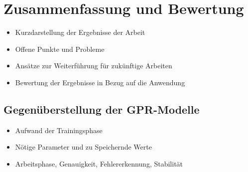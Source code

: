 %

\chapter{Zusammenfassung und Bewertung}\label{ch:zusammenfassung}
\begin{itemize}
	\item Kurzdarstellung der Ergebnisse der Arbeit
	\item Offene Punkte und Probleme
	\item Ansätze zur Weiterführung für zukünftige Arbeiten
	\item Bewertung der Ergebnisse in Bezug auf die Anwendung
\end{itemize}
\section{Gegenüberstellung der GPR-Modelle}\label{sec:gegenueberstellung-gpr-modelle}
\begin{itemize}
	\item Aufwand der Trainingsphase
	\item Nötige Parameter und zu Speichernde Werte
	\item Arbeitsphase, Genauigkeit, Fehlererkennung, Stabilität
\end{itemize}